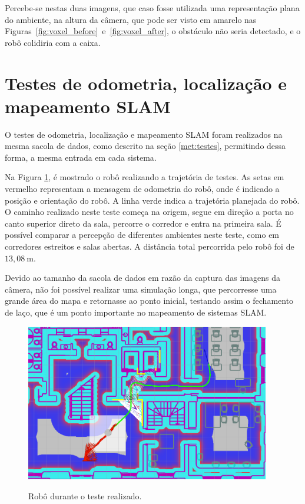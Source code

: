 \documentclass[repeatfields,xlists,xpacks,oneside,yearsonly]{ufrgscca}
\begin{document}
Percebe-se nestas duas imagens, que caso fosse utilizada uma
representação plana do ambiente, na altura da câmera, que pode ser
visto em amarelo nas
Figuras~\ref{fig:voxel_before}~e~\ref{fig:voxel_after}, o obstáculo
não seria detectado, e o robô colidiria com a caixa.

\section{Testes de odometria, localização e mapeamento SLAM}

O testes de odometria, localização e mapeamento SLAM foram realizados
na mesma sacola de dados, como descrito na seção \ref{met:testes},
permitindo dessa forma, a mesma entrada em cada sistema.

Na Figura \ref{fig:base_bag}, é mostrado o robô realizando a
trajetória de testes. As setas em vermelho representam a mensagem de
odometria do robô, onde é indicado a posição e orientação do robô. A
linha verde indica a trajetória planejada do robô. O caminho
realizado neste teste começa na origem, segue em direção a porta no
canto superior direto da sala, percorre o corredor e entra na
primeira sala. É possível comparar a percepção de diferentes
ambientes neste teste, como em corredores estreitos e salas abertas.
A distância total percorrida pelo robô foi de $13,08~\si{\meter}$.

Devido ao tamanho da sacola de dados em razão da captura das imagens
da câmera, não foi possível realizar uma simulação longa, que
percorresse uma grande área do mapa e retornasse ao ponto inicial,
testando assim o fechamento de laço, que é um ponto importante no
mapeamento de sistemas SLAM.

\begin{figure}[h]
    {
        \centering
        \caption{Robô durante o teste realizado.}
        \label{fig:base_bag}
        \includegraphics[width=0.95\textwidth]{base_bag_sim_zoom.png}\\
    }
\end{figure}
\end{document}
